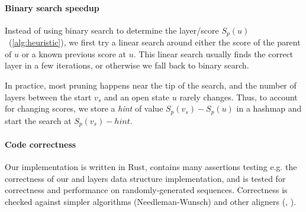 \paragraph{Binary search speedup}
Instead of using binary search to determine the layer/score
$S_p(u)$~(\cref{alg:heuristic}), we first try a linear search around either the
score of the parent of $u$ or a known previous score at $u$. This linear search
usually finds the correct layer in a few iterations, or otherwise we fall back
to binary search.

In practice, most pruning happens near the tip of the search, and the number of
layers between the start $v_s$ and an open state $u$ rarely changes. Thus, to
account for changing scores, we store a \emph{hint} of value ${S_p(v_s) -
S_p(u)}$ in a hashmap and start the search at $S_p(v_s) - hint$.

\paragraph{Code correctness}
Our implementation \astarpa is written in Rust, contains many assertions testing
e.g. the correctness of our \A and layers data structure implementation,
and is tested for correctness and performance on randomly-generated sequences.
Correctness is checked against simpler algorithms (Needleman-Wunsch) and other
aligners (\edlib, \wfa).
